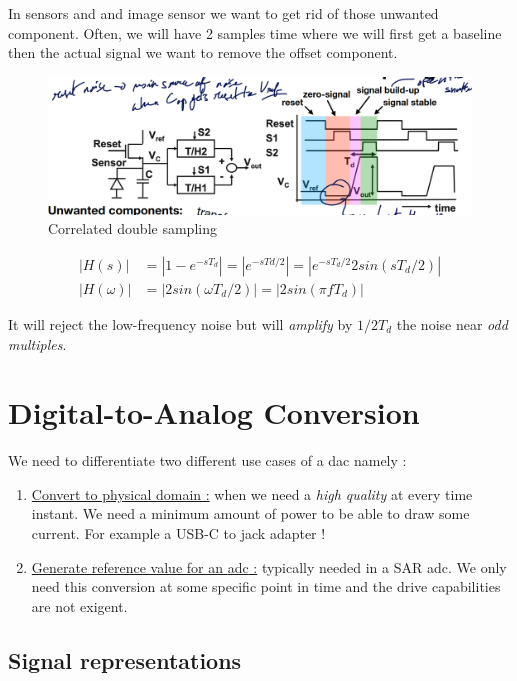 \documentclass{report}
\begin{document}
In sensors and and image sensor we want to get rid of those unwanted component. Often, we will have 2 samples time where we will first get a baseline then the actual signal we want to remove the offset component.

\begin{figure}[H]
    \centering
    \includegraphics[width=0.75\linewidth]{img/double_corr.png}
    \caption{Correlated double sampling}
    \label{fig:double-correlated-label}
\end{figure}

\begin{align}
    |H(s)| &= |1 - e^{-sT_d}| = |e^{-sTd/2}| = |e^{-sT_d /2} 2 sin(sT_d /2) |\\
    |H(\omega)| &= |2sin(\omega T_d / 2)| = |2 sin(\pi f T_d)|
\end{align}

It will reject the low-frequency noise but will \textit{amplify} by $1/2T_d$ the noise near \textit{odd multiples}.

\chapter{Digital-to-Analog Conversion}

We need to differentiate two different use cases of a \gls{dac} namely :

\begin{enumerate}
    \item \underline{Convert to physical domain :} when we need a \textit{high quality} at every time instant. We need a minimum amount of power to be able to draw some current. For example a USB-C to jack adapter !
    \item \underline{Generate reference value for an \gls{adc} :} typically needed in a SAR \gls{adc}. We only need this conversion at some specific point in time and the drive capabilities are not exigent.
\end{enumerate}

\section{Signal representations}
\end{document}
